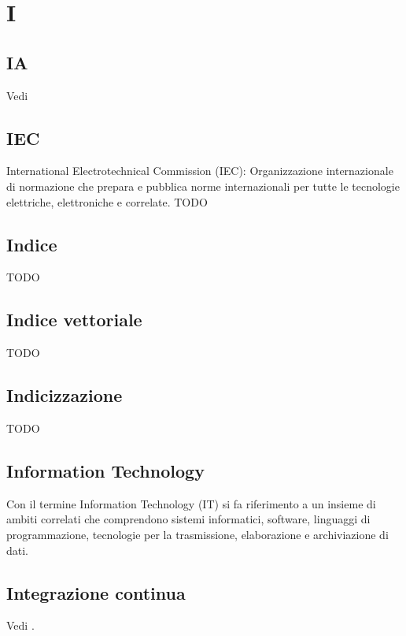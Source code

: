 \section{I}

\vspace{2em}
\subsection*{IA}
\par Vedi 

\vspace{2em}
\subsection*{IEC}
International Electrotechnical Commission (IEC): Organizzazione internazionale di normazione che prepara e pubblica norme internazionali per tutte le tecnologie elettriche, elettroniche e correlate.
TODO

\vspace{2em}
\subsection*{Indice}
TODO

\vspace{2em}
\subsection*{Indice vettoriale}
TODO

\vspace{2em}
\subsection*{Indicizzazione}
TODO

\vspace{2em}
\subsection*{Information Technology}
Con il termine Information Technology (IT) si fa riferimento a un insieme di ambiti correlati che comprendono sistemi informatici, software, linguaggi di programmazione, tecnologie per la trasmissione, elaborazione e archiviazione di dati.

\vspace{2em}
\subsection*{Integrazione continua}
\par Vedi .

